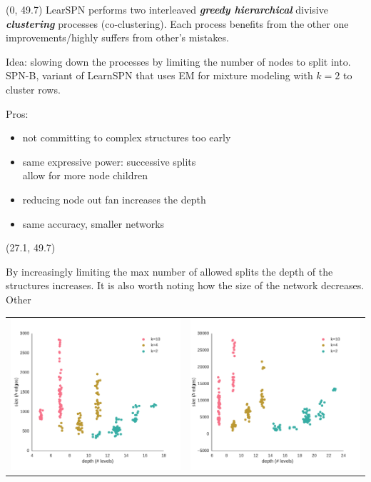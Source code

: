 \documentclass[final]{beamer}
\begin{document}
\begin{frame}{}
  \begin{textblock}{25.7}(0, 49.7)
    \footnotesize
    \textsf{LearSPN} performs two interleaved \textbf{\emph{greedy
        hierarchical}} divisive \textbf{\emph{clustering}}
    processes (co-clustering). Each process benefits from the other one improvements/highly suffers
    from other's mistakes.\par\bigskip

    Idea: slowing down the processes by limiting the number of
    nodes to split into. \textsf{SPN-B}, variant of \textsf{LearnSPN} that uses EM
    for mixture modeling with
    $k=2$ to cluster rows.\par\bigskip

    Pros:
    \begin{itemize}
    \item not committing to complex structures too early  
    \item same expressive power: successive splits\\ allow for more node children
    \item reducing node out fan increases the depth
    \item same accuracy, smaller networks
    \end{itemize}
  \end{textblock}
  
  \begin{textblock}{25.7}(27.1, 49.7)

    \footnotesize
    By increasingly limiting the max number of allowed splits the depth of the
    structures increases. It is also worth noting how the size of the
    network decreases. 
    Other
    
    \begin{table}[ht]
      \setlength{\tabcolsep}{30pt}  
      \centering
      \begin{tabular}{c c}
        \includegraphics[width=0.4\linewidth]{figures/nltcs-depth.pdf}&\includegraphics[width=0.4\linewidth]{figures/plants-depth.pdf}
      \end{tabular}
    \end{table}
  \end{textblock}
  

\end{frame}
\end{document}
